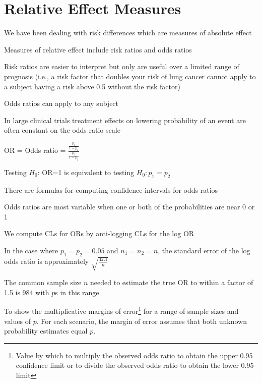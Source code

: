 \section{Relative Effect Measures}
\bi
\item We have been dealing with risk differences which are measures of
  absolute effect
\item Measures of relative effect include risk ratios and odds ratios
\item Risk ratios are easier to interpret but only are useful over a
  limited range of prognosis (i.e., a risk factor that doubles your
  risk of lung cancer cannot apply to a subject having a risk above
  0.5 without the risk factor)
\item Odds ratios can apply to any subject
\item In large clinical trials treatment effects on lowering
  probability of an event are often constant on the odds ratio scale
\item OR = Odds ratio =
  $\frac{\frac{p_{1}}{1-p_{1}}}{\frac{p_{2}}{1-p_{2}}}$
\item Testing $H_{0}$: OR=1 is equivalent to testing
  $H_{0}:p_{1}=p_{2}$
\item There are formulas for computing confidence intervals for odds
  ratios
\item Odds ratios are most variable when one or both of the
  probabilities are near 0 or 1
\item We compute CLs for ORs by anti-logging CLs for the log OR
\item In the case where $p_{1}=p_{2}=0.05$ and $n_{1}=n_{2}=n$, the
  standard error of the log odds ratio is approximately
  $\sqrt{\frac{42.1}{n}}$
\item The common sample size $n$ needed to estimate the true OR to
  within a factor of 1.5 is 984 with $p$s in this range
\item To show the multiplicative margins of error\footnote{Value by
    which to multiply the observed odds ratio to obtain the upper 0.95
    confidence limit or to divide the observed odds ratio to obtain
    the lower 0.95 limit} for a range of sample sizes and values of
  $p$.  For each scenario, the margin of error assumes that both
  unknown probability estimates equal $p$.
\ei

